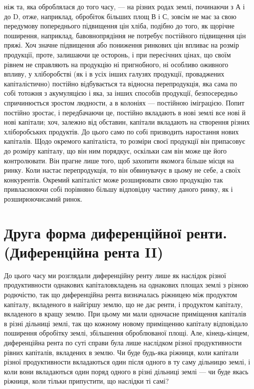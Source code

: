 \parcont{}  %
ніж та, яка оброблялася до того часу, — на різних родах землі, починаючи з А
і до D, отже, наприклад, обробіток більших площ В і С, зовсім не має за свою передумову
попереднього підвищення цін хліба, подібно до того, як щорічне поширення,
наприклад, бавовнопрядіння не потребує постійного підвищення цін пряжі. Хоч
значне підвищення або пониження ринкових цін впливає на розмір продукції,
проте, залишаючи це осторонь, і при пересічних цінах, що своїм рівнем не справляють
на продукцію ні пригнобного, ні особливо оживного впливу, у хліборобстві
(як і в усіх інших галузях продукції, проваджених капіталістично) постійно
відбувається та відносна перепродукція, яка сама по собі тотожня з
акумуляцією і яка, за інших способів продукції, безпосередньо спричинюється
зростом людности, а в колоніях — постійною іміграцією. Попит постійно зростає,
і передбачаючи це, постійно вкладають в нові землі все нові й нові капітали;
хоч, залежно від обставин, капітали вкладають на створення різних хліборобських
продуктів. До цього само по собі призводить наростання нових капіталів.
Щодо окремого капіталіста, то розміри своєї продукції він припасовує до розміру
капіталу, що він ним порядкує, оскільки сам він може ще його контролювати.
Він прагне лише того, щоб захопити якомога більше місця на ринку.
Коли настає перепродукція, то він обвинувачує в цьому не себе, а своїх конкурентів.
Окремий капіталіст може розширювати свою продукцію так привласнюючи
собі порівняно більшу відповідну частину даного ринку, як і розширюючисамий
ринок.

\section{Друга форма диференційної ренти.
(Диференційна рента II)}

До цього часу ми розглядали диференційну ренту лише як наслідок різної
продуктивности однакових капіталовкладень на однакових площах землі з різною
родючістю, так що диференційна рента визначалась ріжницею між продуктом
капіталу, вкладеного в найгіршу землю, що не дає ренти, і продуктом капіталу,
вкладеного в кращу землю. При цьому ми мали одночасне приміщення капіталів
в різні дільниці землі, так що кожному новому приміщенню капіталу відповідало
поширення обробітку землі, збільшення оброблюваної площі. Але, кінець-кінцем,
диференційна рента по суті справи була лише наслідком різної
продуктивности рівних капіталів, вкладених в землю. Чи буде будь-яка ріжниця,
коли капітали різної продуктивности вкладаються один після одного в ту
саму дільницю землі, і коли вони вкладаються один поряд одного в різні дільниці
землі — чи буде якась ріжниця, коли тільки припустити, що наслідки ті самі?

